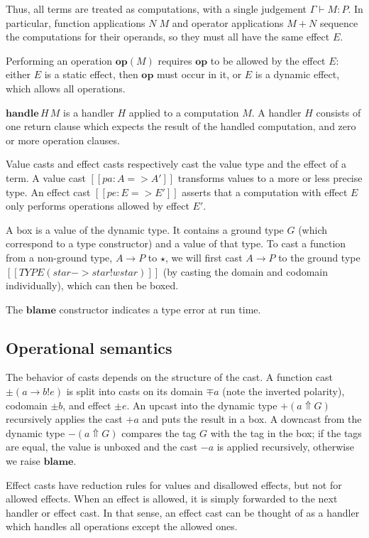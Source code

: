 Thus, all terms are treated as computations, with a single judgement $\Gamma \vdash M : P$.
In particular, function applications $N\;M$ and operator applications $M + N$
sequence the computations for their operands, so they must all have the same
effect $E$.

Performing an operation $\mathbf{op}(M)$ requires $\mathbf{op}$ to be allowed
by the effect $E$: either $E$ is a static effect, then $\mathbf{op}$ must occur
in it, or $E$ is a dynamic effect, which allows all operations.

$\mathbf{handle}\,H\,M$ is a handler $H$ applied to a computation $M$.
A handler $H$ consists of one return clause which expects the result of the
handled computation, and zero or more operation clauses.

Value casts and effect casts respectively cast the value type and the effect of a term.
A value cast $[[pa : A => A']]$ transforms values to a more or less precise type.
An effect cast $[[pe : E => E']]$ asserts that a computation with effect $E$
only performs operations allowed by effect $E'$.

A box is a value of the dynamic type. It contains a ground type $G$
(which correspond to a type constructor) and a value of that type.
To cast a function from a non-ground type, $A \to P$ to $\star$,
we will first cast $A \to P$ to the ground type
$[[TYPE ( star -> star ! wstar )]]$ (by casting the domain and codomain individually),
which can then be boxed.

The $\mathbf{blame}$ constructor indicates a type error at run time.

\subsection{Operational semantics}

The behavior of casts depends on the structure of the cast.
A function cast $\pm (a \to b ! e)$
is split into casts on its domain $\mp a$ (note the inverted polarity), codomain $\pm b$, and effect $\pm e$.
An upcast into the dynamic type $+ (a \Uparrow G)$
recursively applies the cast $+ a$ and puts the result in a box.
A downcast from the dynamic type $- (a \Uparrow G)$ compares
the tag $G$ with the tag in the box; if the tags are equal, the value is
unboxed and the cast $- a$ is applied recursively,
otherwise we raise $\mathbf{blame}$.

Effect casts have reduction rules for values and disallowed effects,
but not for allowed effects. When an effect is allowed, it is simply
forwarded to the next handler or effect cast. In that sense,
an effect cast can be thought of as a handler which handles all operations
except the allowed ones.

